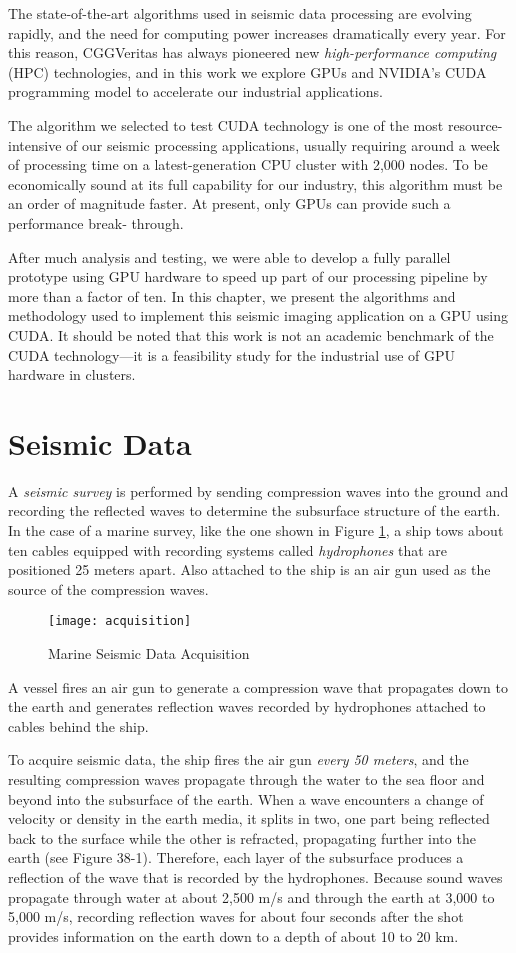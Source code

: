 \documentclass[twocolumn]{article}
\begin{document}
The state-of-the-art algorithms used in seismic data processing are evolving rapidly, and the need for computing power increases dramatically every year. For this reason, CGGVeritas has always pioneered new \emph{high-performance computing} (HPC) technologies, and in this work we explore GPUs and NVIDIA's CUDA programming model to accelerate our industrial applications.

The algorithm we selected to test CUDA technology is one of the most resource-intensive of our seismic processing applications, usually requiring around a week of processing time on a latest-generation CPU cluster with 2,000 nodes. To be economically sound at its full capability for our industry, this algorithm must be an order of magnitude faster. At present, only GPUs can provide such a performance break‐ through.

After much analysis and testing, we were able to develop a fully parallel prototype using GPU hardware to speed up part of our processing pipeline by more than a factor of ten. In this chapter, we present the algorithms and methodology used to implement this seismic imaging application on a GPU using CUDA. It should be noted that this work is not an academic benchmark of the CUDA technology—it is a feasibility study for the industrial use of GPU hardware in clusters.

\section{Seismic Data}
A \emph{seismic survey} is performed by sending compression waves into the ground and recording the reflected waves to determine the subsurface structure of the earth. In the case of a marine survey, like the one shown in Figure \ref{acquisition}, a ship tows about ten cables equipped with recording systems called \emph{hydrophones} that are positioned 25 meters apart. Also attached to the ship is an air gun used as the source of the compression waves.

\begin{figure}[htb]
        \centering
        \texttt{[image: acquisition]}
        \caption{Marine Seismic Data Acquisition}
        \label{acquisition}
\end{figure}
A vessel fires an air gun to generate a compression wave that propagates down to the earth and generates reflection waves recorded by hydrophones attached to cables behind the ship.

To acquire seismic data, the ship fires the air gun \emph{every 50 meters}, and the resulting compression waves propagate through the water to the sea floor and beyond into the subsurface of the earth. When a wave encounters a change of velocity or density in the earth media, it splits in two, one part being reflected back to the surface while the other is refracted, propagating further into the earth (see Figure 38-1). Therefore, each layer of the subsurface produces a reflection of the wave that is recorded by the hydrophones. Because sound waves propagate through water at about 2,500 m/s and through the earth at 3,000 to 5,000 m/s, recording reflection waves for about four seconds after the shot provides information on the earth down to a depth of about 10 to 20 km.
\end{document}
